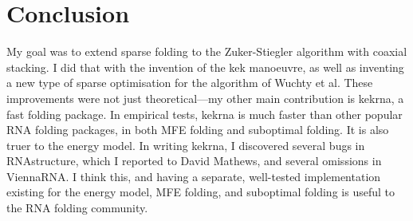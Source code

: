 \documentclass{cshonours}
\begin{document}
\section{Conclusion}
My goal was to extend sparse folding to the Zuker-Stiegler algorithm with coaxial stacking. I did that with the invention of the kek manoeuvre, as well as inventing a new type of sparse optimisation for the algorithm of Wuchty et al. These improvements were not just theoretical---my other main contribution is kekrna, a fast folding package. In empirical tests, kekrna is much faster than other popular RNA folding packages, in both MFE folding and suboptimal folding. It is also truer to the energy model. In writing kekrna, I discovered several bugs in RNAstructure, which I reported to David Mathews, and several omissions in ViennaRNA. I think this, and having a separate, well-tested implementation existing for the energy model, MFE folding, and suboptimal folding is useful to the RNA folding community.
\end{document}
